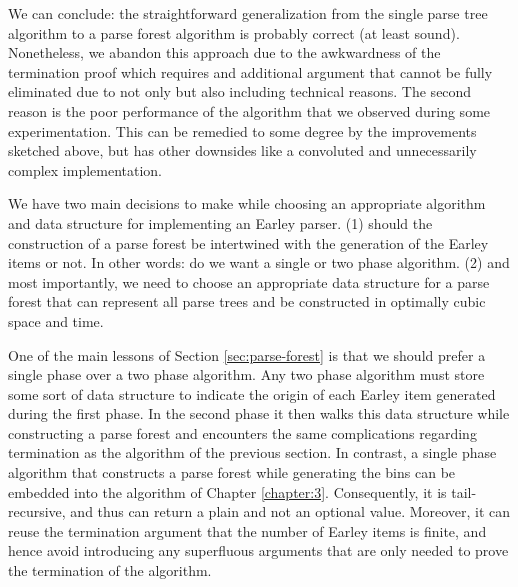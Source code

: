 \begin{isabellebody}
\begin{isamarkuptext}
We can conclude: the straightforward generalization from the single parse tree algorithm to a parse
forest algorithm is probably correct (at least sound). Nonetheless, we abandon this approach due to the
awkwardness of the termination proof which requires and additional argument that cannot be fully eliminated
due to not only but also including technical reasons. The second reason is the poor performance of the algorithm that we observed during some experimentation.
This can be remedied to some degree by the improvements sketched above, but has other downsides like a convoluted
and unnecessarily complex implementation.%
\end{isamarkuptext}\isamarkuptrue%
%
\isadelimdocument
%
\endisadelimdocument
%
\isatagdocument
%
\isamarkuptrue%
%
\endisatagdocument
{\isafolddocument}%
%
\isadelimdocument
%
\endisadelimdocument
%
\begin{isamarkuptext}%
We have two main decisions to make while choosing an appropriate algorithm and data structure for implementing
an Earley parser. (1) should the construction of a parse forest be intertwined with the generation of the
Earley items or not. In other words: do we want a single or two phase algorithm. (2) and most importantly,
we need to choose an appropriate data structure for a parse forest that can represent all parse trees and
be constructed in optimally cubic space and time.

One of the main lessons of Section \ref{sec:parse-forest} is that we should prefer a single phase over a two
phase algorithm. Any two phase algorithm must store some sort of data structure to indicate the origin
of each Earley item generated during the first phase. In the second phase it then walks this data structure while
constructing a parse forest and encounters the same complications regarding termination as the algorithm
of the previous section. In contrast, a single phase algorithm that constructs a parse forest while
generating the bins can be embedded into the algorithm of Chapter \ref{chapter:3}. Consequently, it is tail-recursive, 
and thus can return a plain and not an optional value. Moreover, it can reuse the termination argument that the
number of Earley items is finite, and hence avoid introducing any superfluous arguments that are only needed
to prove the termination of the algorithm.


\end{isamarkuptext}
\end{isabellebody}
